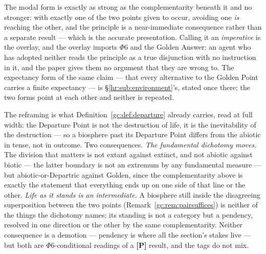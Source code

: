\documentclass[11pt]{article}
\numberwithin{equation}{section}
\theoremstyle{plain}
\theoremstyle{definition}
\theoremstyle{remark}
\begin{document}
The modal form is exactly as strong as the complementarity beneath it and no stronger: with exactly one of the two points given to occur, avoiding one \emph{is} reaching the other, and the principle is a near-immediate consequence rather than a separate result --- which is the accurate presentation. Calling it an \emph{imperative} is the overlay, and the overlay imports $\Phi6$ and the Golden Answer: an agent who has adopted neither reads the principle as a true disjunction with no instruction in it, and the paper gives them no argument that they are wrong to. The expectancy form of the same claim --- that every alternative to the Golden Point carries a finite expectancy --- is \S\ref{hr:sub:environment}'s, stated once there; the two forms point at each other and neither is repeated.

The reframing is what Definition~\ref{gc:def:departure} already carries, read at full width: the Departure Point is not the destruction of life, it is the inevitability of the destruction --- so a biosphere past its Departure Point differs from the abiotic in tense, not in outcome. Two consequences. \emph{The fundamental dichotomy moves.} The division that matters is not extant against extinct, and not abiotic against biotic --- the latter boundary is not an extremum by any fundamental measure --- but abiotic-or-Departric against Golden, since the complementarity above is exactly the statement that everything ends up on one side of that line or the other. \emph{Life as it stands is an intermediate.} A biosphere still inside the disagreeing superposition between the two points (Remark~\ref{gc:rem:pairsuffices}) is neither of the things the dichotomy names; its standing is not a category but a pendency, resolved in one direction or the other by the same complementarity. Neither consequence is a demotion --- pendency is where all the section's stakes live --- but both are $\Phi6$-conditional readings of a \textbf{[P]} result, and the tags do not mix.
\end{document}

